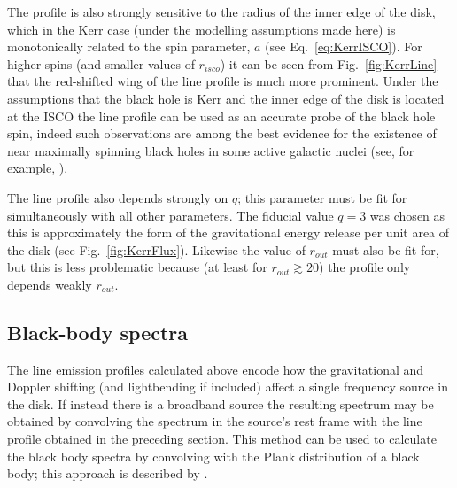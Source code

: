 The profile is also strongly sensitive to the radius of the inner edge of the disk, which in the Kerr case (under the modelling assumptions made here) is monotonically related to the spin parameter, $a$ (see Eq.\ \ref{eq:KerrISCO}). For higher spins (and smaller values of $r_{isco}$) it can be seen from Fig.\ \ref{fig:KerrLine} that the red-shifted wing of the line profile is much more prominent. Under the assumptions that the black hole is Kerr and the inner edge of the disk is located at the ISCO the line profile can be used as an accurate probe of the black hole spin, indeed such observations are among the best evidence for the existence of near maximally spinning black holes in some active galactic nuclei (see, for example, \cite{1996MNRAS.279..837I}). 

The line profile also depends strongly on $q$; this parameter must be fit for simultaneously with all other parameters. The fiducial value $q=3$ was chosen as this is approximately the form of the gravitational energy release per unit area of the disk (see Fig.\ \ref{fig:KerrFlux}). Likewise the value of $r_{out}$ must also be fit for, but this is less problematic because (at least for $r_{out}\gtrsim 20$) the profile only depends weakly $r_{out}$.


\subsection{Black-body spectra}\label{subsec:therm}
The line emission profiles calculated above encode how the gravitational and Doppler shifting (and lightbending if included) affect a single frequency source in the disk. If instead there is a broadband source the resulting spectrum may be obtained by convolving the spectrum in the source's rest frame with the line profile obtained in the preceding section. This method can be used to calculate the black body spectra by convolving with the Plank distribution of a black body; this approach is described by \cite{1975ApJ...202..788C}.


